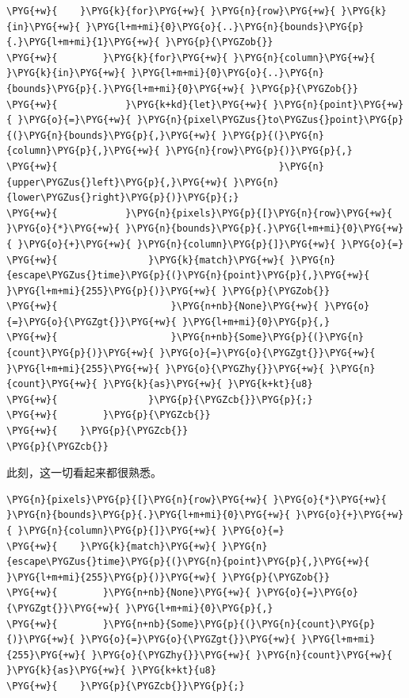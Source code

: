 \begin{Verbatim}[commandchars=\\\{\},breaklines=true,breakanywhere=true,fontsize=\codefont,xleftmargin=17bp]
\PYG{+w}{    }\PYG{k}{for}\PYG{+w}{ }\PYG{n}{row}\PYG{+w}{ }\PYG{k}{in}\PYG{+w}{ }\PYG{l+m+mi}{0}\PYG{o}{..}\PYG{n}{bounds}\PYG{p}{.}\PYG{l+m+mi}{1}\PYG{+w}{ }\PYG{p}{\PYGZob{}}
\PYG{+w}{        }\PYG{k}{for}\PYG{+w}{ }\PYG{n}{column}\PYG{+w}{ }\PYG{k}{in}\PYG{+w}{ }\PYG{l+m+mi}{0}\PYG{o}{..}\PYG{n}{bounds}\PYG{p}{.}\PYG{l+m+mi}{0}\PYG{+w}{ }\PYG{p}{\PYGZob{}}
\PYG{+w}{            }\PYG{k+kd}{let}\PYG{+w}{ }\PYG{n}{point}\PYG{+w}{ }\PYG{o}{=}\PYG{+w}{ }\PYG{n}{pixel\PYGZus{}to\PYGZus{}point}\PYG{p}{(}\PYG{n}{bounds}\PYG{p}{,}\PYG{+w}{ }\PYG{p}{(}\PYG{n}{column}\PYG{p}{,}\PYG{+w}{ }\PYG{n}{row}\PYG{p}{)}\PYG{p}{,}
\PYG{+w}{                                       }\PYG{n}{upper\PYGZus{}left}\PYG{p}{,}\PYG{+w}{ }\PYG{n}{lower\PYGZus{}right}\PYG{p}{)}\PYG{p}{;}
\PYG{+w}{            }\PYG{n}{pixels}\PYG{p}{[}\PYG{n}{row}\PYG{+w}{ }\PYG{o}{*}\PYG{+w}{ }\PYG{n}{bounds}\PYG{p}{.}\PYG{l+m+mi}{0}\PYG{+w}{ }\PYG{o}{+}\PYG{+w}{ }\PYG{n}{column}\PYG{p}{]}\PYG{+w}{ }\PYG{o}{=}
\PYG{+w}{                }\PYG{k}{match}\PYG{+w}{ }\PYG{n}{escape\PYGZus{}time}\PYG{p}{(}\PYG{n}{point}\PYG{p}{,}\PYG{+w}{ }\PYG{l+m+mi}{255}\PYG{p}{)}\PYG{+w}{ }\PYG{p}{\PYGZob{}}
\PYG{+w}{                    }\PYG{n+nb}{None}\PYG{+w}{ }\PYG{o}{=}\PYG{o}{\PYGZgt{}}\PYG{+w}{ }\PYG{l+m+mi}{0}\PYG{p}{,}
\PYG{+w}{                    }\PYG{n+nb}{Some}\PYG{p}{(}\PYG{n}{count}\PYG{p}{)}\PYG{+w}{ }\PYG{o}{=}\PYG{o}{\PYGZgt{}}\PYG{+w}{ }\PYG{l+m+mi}{255}\PYG{+w}{ }\PYG{o}{\PYGZhy{}}\PYG{+w}{ }\PYG{n}{count}\PYG{+w}{ }\PYG{k}{as}\PYG{+w}{ }\PYG{k+kt}{u8}
\PYG{+w}{                }\PYG{p}{\PYGZcb{}}\PYG{p}{;}
\PYG{+w}{        }\PYG{p}{\PYGZcb{}}
\PYG{+w}{    }\PYG{p}{\PYGZcb{}}
\PYG{p}{\PYGZcb{}}
\end{Verbatim}

此刻，这一切看起来都很熟悉。

\begin{Verbatim}[commandchars=\\\{\},breaklines=true,breakanywhere=true,fontsize=\codefont,xleftmargin=17bp]
\PYG{n}{pixels}\PYG{p}{[}\PYG{n}{row}\PYG{+w}{ }\PYG{o}{*}\PYG{+w}{ }\PYG{n}{bounds}\PYG{p}{.}\PYG{l+m+mi}{0}\PYG{+w}{ }\PYG{o}{+}\PYG{+w}{ }\PYG{n}{column}\PYG{p}{]}\PYG{+w}{ }\PYG{o}{=}
\PYG{+w}{    }\PYG{k}{match}\PYG{+w}{ }\PYG{n}{escape\PYGZus{}time}\PYG{p}{(}\PYG{n}{point}\PYG{p}{,}\PYG{+w}{ }\PYG{l+m+mi}{255}\PYG{p}{)}\PYG{+w}{ }\PYG{p}{\PYGZob{}}
\PYG{+w}{        }\PYG{n+nb}{None}\PYG{+w}{ }\PYG{o}{=}\PYG{o}{\PYGZgt{}}\PYG{+w}{ }\PYG{l+m+mi}{0}\PYG{p}{,}
\PYG{+w}{        }\PYG{n+nb}{Some}\PYG{p}{(}\PYG{n}{count}\PYG{p}{)}\PYG{+w}{ }\PYG{o}{=}\PYG{o}{\PYGZgt{}}\PYG{+w}{ }\PYG{l+m+mi}{255}\PYG{+w}{ }\PYG{o}{\PYGZhy{}}\PYG{+w}{ }\PYG{n}{count}\PYG{+w}{ }\PYG{k}{as}\PYG{+w}{ }\PYG{k+kt}{u8}
\PYG{+w}{    }\PYG{p}{\PYGZcb{}}\PYG{p}{;}
\end{Verbatim}

